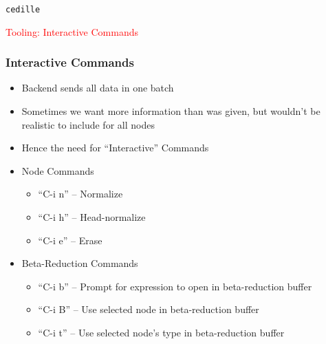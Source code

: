 \documentclass[11pt]{beamer}
\date{\ }
\begin{document}

\begin{frame}

\begin{center}

{\Huge \texttt{cedille}}

\vspace{1cm}

{\Large \textcolor{red}{Tooling: Interactive Commands}}

\end{center}

\end{frame}




\begin{frame}
\frametitle{Interactive Commands}
\begin{itemize}
\item Backend sends all data in one batch
\pause
\item Sometimes we want more information than was given, but wouldn't be realistic to include for all nodes
\pause
\item Hence the need for ``Interactive'' Commands
\pause
\item Node Commands
\pause
\begin{itemize}
\item ``C-i n'' -- Normalize
\pause
\item ``C-i h'' -- Head-normalize
\pause
\item ``C-i e'' -- Erase
\end{itemize}
\pause
\item Beta-Reduction Commands
\pause
\begin{itemize}
\item ``C-i b'' -- Prompt for expression to open in beta-reduction buffer
\pause
\item ``C-i B'' -- Use selected node in beta-reduction buffer
\pause
\item ``C-i t'' -- Use selected node's type in beta-reduction buffer
\end{itemize}

\end{itemize}

\end{frame}
\end{document}
